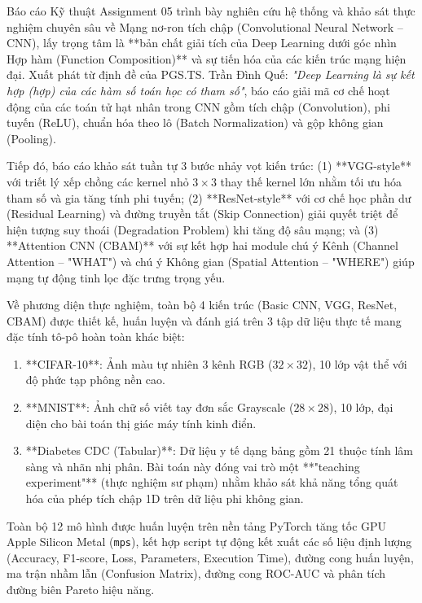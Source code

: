 \documentclass[12pt,a4paper]{article}
\begin{document}
Báo cáo Kỹ thuật Assignment 05 trình bày nghiên cứu hệ thống và khảo sát thực nghiệm chuyên sâu về Mạng nơ-ron tích chập (Convolutional Neural Network -- CNN), lấy trọng tâm là **bản chất giải tích của Deep Learning dưới góc nhìn Hợp hàm (Function Composition)** và sự tiến hóa của các kiến trúc mạng hiện đại. Xuất phát từ định đề của PGS.TS. Trần Đình Quế: \textit{"Deep Learning là sự kết hợp (hợp) của các hàm số toán học có tham số"}, báo cáo giải mã cơ chế hoạt động của các toán tử hạt nhân trong CNN gồm tích chập (Convolution), phi tuyến (ReLU), chuẩn hóa theo lô (Batch Normalization) và gộp không gian (Pooling). 

Tiếp đó, báo cáo khảo sát tuần tự 3 bước nhảy vọt kiến trúc: (1) **VGG-style** với triết lý xếp chồng các kernel nhỏ $3 \times 3$ thay thế kernel lớn nhằm tối ưu hóa tham số và gia tăng tính phi tuyến; (2) **ResNet-style** với cơ chế học phần dư (Residual Learning) và đường truyền tắt (Skip Connection) giải quyết triệt để hiện tượng suy thoái (Degradation Problem) khi tăng độ sâu mạng; và (3) **Attention CNN (CBAM)** với sự kết hợp hai module chú ý Kênh (Channel Attention -- "WHAT") và chú ý Không gian (Spatial Attention -- "WHERE") giúp mạng tự động tinh lọc đặc trưng trọng yếu.

Về phương diện thực nghiệm, toàn bộ 4 kiến trúc (Basic CNN, VGG, ResNet, CBAM) được thiết kế, huấn luyện và đánh giá trên 3 tập dữ liệu thực tế mang đặc tính tô-pô hoàn toàn khác biệt:
\begin{enumerate}[leftmargin=*]
    \item **CIFAR-10**: Ảnh màu tự nhiên 3 kênh RGB ($32 \times 32$), 10 lớp vật thể với độ phức tạp phông nền cao.
    \item **MNIST**: Ảnh chữ số viết tay đơn sắc Grayscale ($28 \times 28$), 10 lớp, đại diện cho bài toán thị giác máy tính kinh điển.
    \item **Diabetes CDC (Tabular)**: Dữ liệu y tế dạng bảng gồm 21 thuộc tính lâm sàng và nhãn nhị phân. Bài toán này đóng vai trò một **"teaching experiment"** (thực nghiệm sư phạm) nhằm khảo sát khả năng tổng quát hóa của phép tích chập 1D trên dữ liệu phi không gian.
\end{enumerate}

Toàn bộ 12 mô hình được huấn luyện trên nền tảng PyTorch tăng tốc GPU Apple Silicon Metal (\texttt{mps}), kết hợp script tự động kết xuất các số liệu định lượng (Accuracy, F1-score, Loss, Parameters, Execution Time), đường cong huấn luyện, ma trận nhầm lẫn (Confusion Matrix), đường cong ROC-AUC và phân tích đường biên Pareto hiệu năng.
\end{document}
